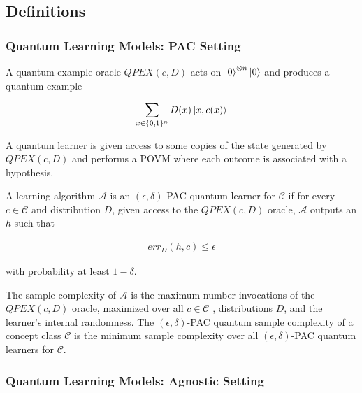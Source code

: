 \documentclass[main.tex]{subfiles}
\begin{document}
\subsection{Definitions}

\subsubsection{Quantum Learning Models: PAC Setting}

A quantum example oracle $QPEX(c,D)$ acts on $\ket{0}^{\otimes n}\ket{0}$ and produces a quantum example 

\begin{align}
\sum_{x\in\{0,1\}^n} D(x)\ket{x,c(x)}	
\end{align}

A quantum learner is given access to some copies of the state generated by $QPEX(c,D)$ and performs a POVM where each outcome is associated with a hypothesis. 

A learning algorithm $\mathcal{A}$ is an $(\epsilon, \delta)$-PAC quantum learner for $\mathcal{C}$ if for every $c \in \mathcal{C}$ and distribution $D$, given access to the $QPEX(c,D)$ oracle, $\mathcal{A}$ outputs an $h$ such that 

\begin{align}
err_D (h, c) \leq \epsilon	
\end{align}

with probability at least $1 - \delta$.

The sample complexity of $\mathcal{A}$ is the maximum number invocations of the $QPEX(c,D)$ oracle, maximized over all $c \in \mathcal{C}$ , distributions $D$, and the learner’s internal randomness. The $(\epsilon, \delta)$-PAC quantum sample complexity of a concept class $\mathcal{C}$ is the minimum sample complexity over all $(\epsilon,\delta)$-PAC quantum learners for $\mathcal{C}$.


\subsubsection{Quantum Learning Models: Agnostic Setting}
\end{document}

